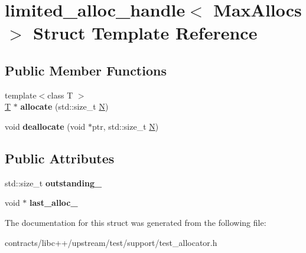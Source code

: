 \hypertarget{structlimited__alloc__handle}{}\section{limited\+\_\+alloc\+\_\+handle$<$ Max\+Allocs $>$ Struct Template Reference}
\label{structlimited__alloc__handle}
\subsection*{Public Member Functions}
\begin{DoxyCompactItemize}
\item 
\mbox{\label{structlimited__alloc__handle_af2a3b6d333c832e28f6ad86863d8e9cd}} 
{\footnotesize template$<$class T $>$ }\\\mbox{\hyperlink{struct_t}{T}} $\ast$ {\bfseries allocate} (std\+::size\+\_\+t \mbox{\hyperlink{group__types_gaf9c1edb0e0da55ec6ba09f32f6839529}{N}})
\item 
\mbox{\label{structlimited__alloc__handle_a06ae49eff9bcdd89a287efa6a17ad68b}} 
void {\bfseries deallocate} (void $\ast$ptr, std\+::size\+\_\+t \mbox{\hyperlink{group__types_gaf9c1edb0e0da55ec6ba09f32f6839529}{N}})
\end{DoxyCompactItemize}
\subsection*{Public Attributes}
\begin{DoxyCompactItemize}
\item 
\mbox{\label{structlimited__alloc__handle_acda14e9cffc463f1d0f7df159193c224}} 
std\+::size\+\_\+t {\bfseries outstanding\+\_\+}
\item 
\mbox{\label{structlimited__alloc__handle_ad26b5b24e470df12d75fde8c2be6221a}} 
void $\ast$ {\bfseries last\+\_\+alloc\+\_\+}
\end{DoxyCompactItemize}


The documentation for this struct was generated from the following file\+:\begin{DoxyCompactItemize}
\item 
contracts/libc++/upstream/test/support/test\+\_\+allocator.\+h\end{DoxyCompactItemize}
